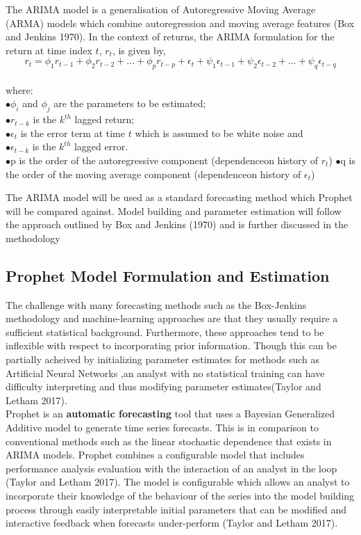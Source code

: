\documentclass[12pt,a4paper]{article}
\numberwithin{equation}{section}
\numberwithin{figure}{section}
\numberwithin{table}{section}
\begin{document}
The ARIMA model is a generalisation of Autoregressive Moving Average
(ARMA) models which combine autoregression and moving average features
(Box and Jenkins 1970). In the context of returns, the ARIMA formulation
for the return at time index \(t\), \(r_t\), is given by,
\[  r_t = \phi_1 r_{t-1} + \phi_2 r_{t-2} + ...+ \phi_p r_{t-p} + \epsilon_t +
        \psi_1 \epsilon_{t-1} + \psi_2 \epsilon_{t-2} + ... +\psi_q \epsilon_{t-q} \]\\
where:\\
\(\bullet \phi_i\) and \(\phi_j\) are the parameters to be estimated;\\
\(\bullet r_{t-k}\) is the \(k^{th}\) lagged return;\\
\(\bullet \epsilon_t\) is the error term at time \(t\) which is assumed
to be white noise and\\
\(\bullet\epsilon_{t-k}\) is the \(k^{th}\) lagged error.\\
\(\bullet\)p is the order of the autoregressive component (dependenceon
history of \(r_t\)) \(\bullet\)q is the order of the moving average
component (dependenceon history of \(\epsilon_t\))

The ARIMA model will be used as a standard forecasting method which
Prophet will be compared against. Model building and parameter
estimation will follow the approach outlined by Box and Jenkins (1970)
and is further discussed in the methodology

\subsection{Prophet Model Formulation and
Estimation}\label{prophet-model-formulation-and-estimation}

The challenge with many forecasting methods such as the Box-Jenkins
methodology and machine-learning approaches are that they usually
require a sufficient statistical background. Furthermore, these
approaches tend to be inflexible with respect to incorporating prior
information. Though this can be partially acheived by initializing
parameter estimates for methods such as Artificial Neural Networks ,an
analyst with no statistical training can have difficulty interpreting
and thus modifying parameter estimates(Taylor and Letham 2017).\\
Prophet is an \textbf{automatic forecasting} tool that uses a Bayesian
Generalized Additive model to generate time series forecasts. This is in
comparison to conventional methods such as the linear stochastic
dependence that exists in ARIMA models. Prophet combines a configurable
model that includes performance analysis evaluation with the interaction
of an analyst in the loop (Taylor and Letham 2017). The model is
configurable which allows an analyst to incorporate their knowledge of
the behaviour of the series into the model building process through
easily interpretable initial parameters that can be modified and
interactive feedback when forecasts under-perform (Taylor and Letham
2017).
\end{document}
